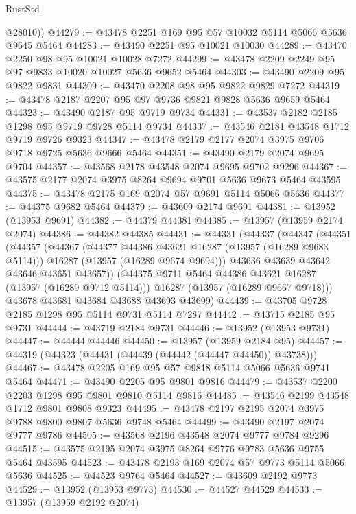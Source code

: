 \begin{lexlean}{RustStd}
\begin{coremodule}
        @28010))
@44279 := @43478 @2251 @169 @95 @57 @10032 @5114 @5066 @5636 @9645 @5464
@44283 := @43490 @2251 @95 @10021 @10030
@44289 := @43470 @2250 @98 @95 @10021 @10028 @7272
@44299 := @43478 @2209 @2249 @95 @97 @9833 @10020 @10027 @5636 @9652 @5464
@44303 := @43490 @2209 @95 @9822 @9831
@44309 := @43470 @2208 @98 @95 @9822 @9829 @7272
@44319 := @43478 @2187 @2207 @95 @97 @9736 @9821 @9828 @5636 @9659 @5464
@44323 := @43490 @2187 @95 @9719 @9734
@44331 := @43537 @2182 @2185 @1298 @95 @9719 @9728 @5114 @9734
@44337 := @43546 @2181 @43548 @1712 @9719 @9726 @9323
@44347 := @43478 @2179 @2177 @2074 @3975 @9706 @9718 @9725 @5636 @9666 @5464
@44351 := @43490 @2179 @2074 @9695 @9704
@44357 := @43568 @2178 @43548 @2074 @9695 @9702 @9296
@44367 := @43575 @2177 @2074 @3975 @8264 @9694 @9701 @5636 @9673 @5464 @43595
@44375 := @43478 @2175 @169 @2074 @57 @9691 @5114 @5066 @5636
@44377 := @44375 @9682 @5464
@44379 := @43609 @2174 @9691
@44381 := @13952 (@13953 @9691)
@44382 := @44379 @44381
@44385 := @13957 (@13959 @2174 @2074)
@44386 := @44382 @44385
@44431 := @44331
    (@44337
      (@44347
        (@44351
          (@44357
            (@44367
              (@44377 @44386 @43621 @16287 (@13957 (@16289 @9683 @5114)))
              @16287
              (@13957 (@16289 @9674 @9694)))
            @43636
            @43639
            @43642
            @43646
            @43651
            @43657))
        (@44375 @9711 @5464 @44386 @43621 @16287 (@13957 (@16289 @9712 @5114)))
        @16287
        (@13957 (@16289 @9667 @9718)))
      @43678
      @43681
      @43684
      @43688
      @43693
      @43699)
@44439 := @43705 @9728 @2185 @1298 @95 @5114 @9731 @5114 @7287
@44442 := @43715 @2185 @95 @9731
@44444 := @43719 @2184 @9731
@44446 := @13952 (@13953 @9731)
@44447 := @44444 @44446
@44450 := @13957 (@13959 @2184 @95)
@44457 := @44319 (@44323 (@44431 (@44439 (@44442 (@44447 @44450)) @43738)))
@44467 := @43478 @2205 @169 @95 @57 @9818 @5114 @5066 @5636 @9741 @5464
@44471 := @43490 @2205 @95 @9801 @9816
@44479 := @43537 @2200 @2203 @1298 @95 @9801 @9810 @5114 @9816
@44485 := @43546 @2199 @43548 @1712 @9801 @9808 @9323
@44495 := @43478 @2197 @2195 @2074 @3975 @9788 @9800 @9807 @5636 @9748 @5464
@44499 := @43490 @2197 @2074 @9777 @9786
@44505 := @43568 @2196 @43548 @2074 @9777 @9784 @9296
@44515 := @43575 @2195 @2074 @3975 @8264 @9776 @9783 @5636 @9755 @5464 @43595
@44523 := @43478 @2193 @169 @2074 @57 @9773 @5114 @5066 @5636
@44525 := @44523 @9764 @5464
@44527 := @43609 @2192 @9773
@44529 := @13952 (@13953 @9773)
@44530 := @44527 @44529
@44533 := @13957 (@13959 @2192 @2074)

\end{coremodule}
\end{lexlean}

